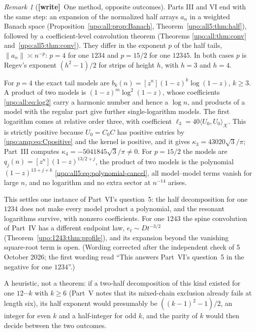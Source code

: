 \documentclass[11pt,letterpaper]{article}
\theoremstyle{remark}\newtheorem{remark}[theorem]{Remark}
\numberwithin{equation}{section}
\newcommand{\wtag}{\textup{\textbf{[write]}}}
\begin{document}
\begin{remark}[\wtag\ One method, opposite outcomes]\label{upo:rem:dichotomy}
Parts III and VI end with the same step: an expansion of the normalized half arrays $a_n$ in a weighted Banach space (Proposition~\ref{upo:all:prop:Banach}, Theorem~\ref{upo:all5:thm:half}), followed by a coefficient-level convolution theorem (Theorems \ref{upo:all:thm:conv} and~\ref{upo:all5:thm:conv}). They differ in the exponent $p$ of the half tails, $\|a_n\|\asymp n^{-p}$: $p=4$ for one $1234$ and $p=15/2$ for one $12345$. In both cases $p$ is Regev's exponent $(h^2-1)/2$ for strips of height $h$, with $h=3$ and $h=4$.

For $p=4$ the exact tail models are $b_k(n)=[z^n](1-z)^k\log(1-z)$, $k\ge3$. A product of two models is $(1-z)^m\log^2(1-z)$, whose coefficients \eqref{upo:all:eq:log2} carry a harmonic number and hence a $\log n$, and products of a model with the regular part give further single-logarithm models. The first logarithm comes at relative order three, with coefficient $\ell_3=40\langle U_0,U_0\rangle_{\mathcal K}$. This is strictly positive because $U_0=C_0C$ has positive entries by \eqref{upo:amp:eq:Cpositive} and the kernel is positive, and it gives $\kappa_3=43020\sqrt3/\pi$; Part~III computes $\kappa_4=-5041845\sqrt3/\pi\ne0$. For $p=15/2$ the models are $q_j(n)=[z^n](1-z)^{13/2+j}$, the product of two models is the polynomial $(1-z)^{13+j+k}$ \eqref{upo:all5:eq:polynomial-cancel}, all model--model terms vanish for large $n$, and no logarithm and no extra sector at $n^{-14}$ arises.

This settles one instance of Part~VI's question~5: the half decomposition for one $1234$ does not make every model product a polynomial, and the resonant logarithms survive, with nonzero coefficients. For one $1243$ the spine convolution of Part~IV has a different endpoint law, $e_t\sim Dt^{-3/2}$ (Theorem~\ref{upo:1243:thm:profile}), and its expansion beyond the vanishing square-root term is open. \textup{(Wording corrected after the independent check of 5 October 2026; the first wording read ``This answers Part~VI's question~5 in the negative for one $1234$''.)}

A heuristic, not a theorem: if a two-half decomposition of this kind existed for one $12\cdots k$ with $k\ge6$ (Part~V notes that its mixed-chain exclusion already fails at length six), its half exponent would presumably be $((k-1)^2-1)/2$, an integer for even $k$ and a half-integer for odd $k$, and the parity of $k$ would then decide between the two outcomes.
\end{remark}
\end{document}
